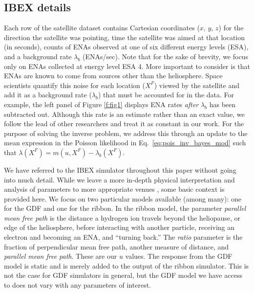 \documentclass[11pt]{article}
\begin{document}
\subsection{IBEX details}
\label{sec:ibex_details}

Each row of the satellite dataset contains Cartesian coordinates ($x$, $y$,
$z$) for the direction the satellite was pointing, time the satellite was aimed
at that location (in seconds), counts of ENAs observed at one of six different
energy levels (ESA), and a background rate $\lambda_b$ (ENAs/sec). Note that
for the sake of brevity, we focus only on ENAs collected at energy level ESA 4.
More important to consider is that ENAs are known to come from sources other
than the heliosphere. Space scientists quantify this noise for each location
($X^F$) viewed by the satellite and add it as a background rate ($\lambda_b$)
that must be accounted for in the data. For example, the left panel of Figure
\ref{f:fig1} displays ENA rates {\em after} $\lambda_b$ has been subtracted
out. Although this rate is an estimate rather than an exact value, we follow
the lead of other researchers \citep{osthustheseus2023} and treat it as
constant in our work. For the purpose of solving the inverse problem, we
address this through an update to the mean expression in the Poisson likelihood
in Eq.~\ref{eq:pois_inv_bayes_mod} such that $\lambda(X^F) = m(u, X^F) -
\lambda_{b}(X^F)$.

We have referred to the IBEX simulator throughout this paper without going into
much detail. While we leave a more in-depth physical interpretation and
analysis of parameters to more appropriate venues
\citep{zirnstein2021heliosheath,zirnstein2025global,swaczyna2020density,huang2025numerical},
some basic context is provided here. We focus on two particular models
available (among many): one for the GDF and one for the ribbon. In the ribbon
model, the parameter \textit{parallel mean free path} is the distance a
hydrogen ion travels beyond the heliopause, or edge of the heliosphere, before
interacting with another particle, receiving an electron and becoming an ENA,
and ``turning back.'' The \textit{ratio} parameter is the fraction of
perpendicular mean free path, another measure of distance, and \textit{parallel
mean free path}. These are our $u$ values. The response from the GDF model is
static and is merely added to the output of the ribbon simulator. This is not
the case for GDF simulators in general, but the GDF model we have access to
does not vary with any parameters of interest.
\end{document}
